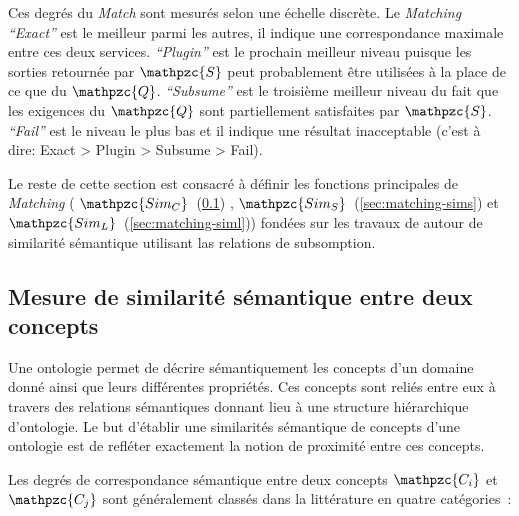 Ces degrés du \emph{Match} sont mesurés selon une échelle discrète. Le
\emph{Matching} \emph{``Exact''} est le meilleur parmi les autres, il
indique une correspondance maximale entre ces deux
services. \emph{``Plugin''} est le prochain meilleur niveau puisque
les sorties retournée par {\large $\mathpzc{S}$} peut probablement
être utilisées à la place de ce que du {\large
  $\mathpzc{Q}$}. \emph{``Subsume''} est le troisième meilleur niveau
du fait que les exigences du {\large $\mathpzc{Q}$} sont partiellement
satisfaites par {\large $\mathpzc{S}$}. \emph{``Fail''} est le niveau
le plus bas et il indique une résultat inacceptable (c'est à dire:
\textsf{Exact > Plugin > Subsume > Fail}).\medskip

Le reste de cette section est consacré à définir les fonctions
principales de \emph{Matching} ({\large
  $\mathpzc{Sim_C}$}~(\ref{sec:matching-simc}) , {\large
  $\mathpzc{Sim_S}$}~(\ref{sec:matching-sims}) et {\large
  $\mathpzc{Sim_L}$}~(\ref{sec:matching-siml})) fondées sur les
travaux de \cite{paolucci2003using, li2004software} autour de
similarité sémantique utilisant las relations de subsomption.

\subsection{Mesure de similarité sémantique entre deux concepts}
\label{sec:matching-simc}

Une ontologie permet de décrire sémantiquement les concepts d'un
domaine donné ainsi que leurs différentes propriétés. Ces concepts
sont reliés entre eux à travers des relations sémantiques donnant lieu
à une structure hiérarchique d'ontologie. Le but d'établir une
similarités sémantique de concepts d'une ontologie est de refléter
exactement la notion de proximité entre ces concepts.\medskip


Les degrés de correspondance sémantique entre deux concepts
$\mathpzc{C_i}$ et $\mathpzc{C_j}$ sont généralement classés dans la
littérature en quatre catégories~\cite{paolucci2002semantic}:\medskip

